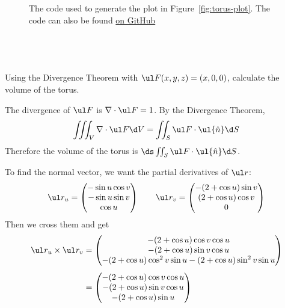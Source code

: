 \documentclass[a4paper]{article}
\begin{document}
\begin{figure}[h]
    \centering
    \inputminted{python}{./code/plot_torus.py}
    \caption{The code used to generate the plot in Figure~\ref{fig:torus-plot}. The code can also be found \href{https://github.com/DoctorDalek1963/uni/blob/9145bb837f02e16d45cf1807d5b1644ecd36a625/first-year/MA144-Methods-of-Mathematical-Modelling-2/Ass 4/code/plot_torus.py}{on GitHub}}
\end{figure}

\clearpage
\subsection{~} %

\begin{questionbody}
Using the Divergence Theorem with $\ul F(x, y, z) = (x, 0, 0)$, calculate the volume of the torus.
\end{questionbody}

The divergence of $\ul F$ is $\nabla \cdot \ul F = 1$. By the Divergence Theorem, \[
\iiint_V \nabla \cdot \ul F \d V = \iint_S \ul F \cdot \ul{\hat n} \d S
\] Therefore the volume of the torus is $\ds \iint_S \ul F \cdot \ul{\hat n} \d S$.

To find the normal vector, we want the partial derivatives of $\ul r$: \[
\ul r_u = \begin{pmatrix} -\sin u \cos v \\ -\sin u \sin v \\ \cos u \end{pmatrix} \qquad
\ul r_v = \begin{pmatrix} -(2 + \cos u) \sin v \\ (2 + \cos u) \cos v \\ 0 \end{pmatrix}
\]
Then we cross them and get \begin{align*}
\ul r_u \times \ul r_v &= \begin{pmatrix} -(2 + \cos u) \cos v \cos u \\ -(2 + \cos u) \sin v \cos u \\ -(2 + \cos u) \cos^2 v \sin u - (2 + \cos u) \sin^2 v \sin u \end{pmatrix}\\[1ex]
&= \begin{pmatrix} -(2 + \cos u) \cos v \cos u \\ -(2 + \cos u) \sin v \cos u \\ -(2 + \cos u) \sin u \end{pmatrix}
\end{align*}
\end{document}
